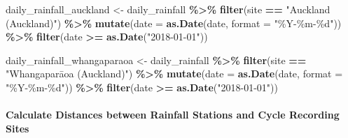 \documentclass[
]{article}
\newenvironment{Shaded}{\begin{snugshade}}{\end{snugshade}}
\newcommand{\AttributeTok}[1]{\textcolor[rgb]{0.13,0.29,0.53}{#1}}
\newcommand{\FunctionTok}[1]{\textcolor[rgb]{0.13,0.29,0.53}{\textbf{#1}}}
\newcommand{\NormalTok}[1]{#1}
\newcommand{\OtherTok}[1]{\textcolor[rgb]{0.56,0.35,0.01}{#1}}
\newcommand{\SpecialCharTok}[1]{\textcolor[rgb]{0.81,0.36,0.00}{\textbf{#1}}}
\newcommand{\StringTok}[1]{\textcolor[rgb]{0.31,0.60,0.02}{#1}}
\begin{document}
\begin{Shaded}
\begin{Highlighting}[]
\NormalTok{daily\_rainfall\_auckland }\OtherTok{\textless{}{-}}\NormalTok{ daily\_rainfall }\SpecialCharTok{\%\textgreater{}\%}
  \FunctionTok{filter}\NormalTok{(site }\SpecialCharTok{==} \StringTok{"Auckland (Auckland)"}\NormalTok{) }\SpecialCharTok{\%\textgreater{}\%}
  \FunctionTok{mutate}\NormalTok{(}\AttributeTok{date =} \FunctionTok{as.Date}\NormalTok{(date, }\AttributeTok{format =} \StringTok{"\%Y{-}\%m{-}\%d"}\NormalTok{)) }\SpecialCharTok{\%\textgreater{}\%}
  \FunctionTok{filter}\NormalTok{(date }\SpecialCharTok{\textgreater{}=} \FunctionTok{as.Date}\NormalTok{(}\StringTok{"2018{-}01{-}01"}\NormalTok{))}

\NormalTok{daily\_rainfall\_whangaparaoa }\OtherTok{\textless{}{-}}\NormalTok{ daily\_rainfall }\SpecialCharTok{\%\textgreater{}\%}
  \FunctionTok{filter}\NormalTok{(site }\SpecialCharTok{==} \StringTok{"Whangaparāoa (Auckland)"}\NormalTok{) }\SpecialCharTok{\%\textgreater{}\%}
  \FunctionTok{mutate}\NormalTok{(}\AttributeTok{date =} \FunctionTok{as.Date}\NormalTok{(date, }\AttributeTok{format =} \StringTok{"\%Y{-}\%m{-}\%d"}\NormalTok{)) }\SpecialCharTok{\%\textgreater{}\%}
  \FunctionTok{filter}\NormalTok{(date }\SpecialCharTok{\textgreater{}=} \FunctionTok{as.Date}\NormalTok{(}\StringTok{"2018{-}01{-}01"}\NormalTok{))}
\end{Highlighting}
\end{Shaded}

\hypertarget{calculate-distances-between-rainfall-stations-and-cycle-recording-sites}{%
\paragraph{Calculate Distances between Rainfall Stations and Cycle
Recording
Sites}\label{calculate-distances-between-rainfall-stations-and-cycle-recording-sites}}
\end{document}

